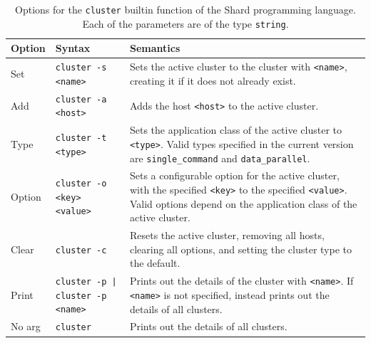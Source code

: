 \documentclass[oneside]{report}
\begin{document}
\begin{table}[h]
  \begin{center}
    \begin{tabularx}{\textwidth}{|l|X|X|}
      \hline
      Option & Syntax                                                                                                                                                                                       & Semantics                                                                                                         \\ \hline
      Set    & \texttt{cluster -s <name>}
             & Sets the active cluster to the cluster with \texttt{<name>}, creating it if it does not already exist.
      \\ \hline
      Add    & \texttt{cluster -a <host>}
             & Adds the host \texttt{<host>} to the active cluster.
      \\ \hline
      Type   & \texttt{cluster -t <type>}
             & Sets the application class of the active cluster to \texttt{<type>}. Valid types specified in the current version are \texttt{single\_command} and \texttt{data\_parallel}.
      \\ \hline
      Option & \texttt{cluster -o <key> <value>}
             & Sets a configurable option for the active cluster, with the specified \texttt{<key>} to the specified \texttt{<value>}. Valid options depend on the application class of the active cluster.
      \\ \hline
      Clear  & \texttt{cluster -c}                                                                                                                                                                          & Resets the active cluster, removing all hosts, clearing all options, and setting the cluster type to the default.
      \\ \hline
      Print  & \texttt{cluster -p | cluster -p <name>}
             & Prints out the details of the cluster with \texttt{<name>}. If \texttt{<name>} is not specified, instead prints out the details of all clusters.
      \\ \hline
      No arg & \texttt{cluster}                                                                                                                                                                             & Prints out the details of all clusters.
      \\ \hline
    \end{tabularx}
    \caption{Options for the \texttt{cluster} builtin function of the Shard programming language. Each of the parameters are of the type \texttt{string}.}
    \label{fig:pl_cluster_options}
  \end{center}
\end{table}
\end{document}

